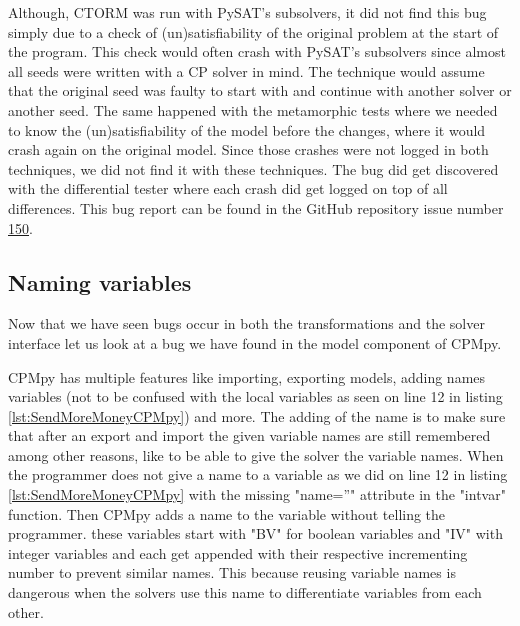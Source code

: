 Although, CTORM was run with PySAT's subsolvers, it did not find this bug simply due to a check of (un)satisfiability of the original problem at the start of the program. This check would often crash with PySAT's subsolvers since almost all seeds were written with a CP solver in mind. The technique would assume that the original seed was faulty to start with and continue with another solver or another seed. The same happened with the metamorphic tests where we needed to know the (un)satisfiability of the model before the changes, where it would crash again on the original model. Since those crashes were not logged in both techniques, we did not find it with these techniques. The bug did get discovered with the differential tester where each crash did get logged on top of all differences. This bug report can be found in the GitHub repository issue number \href{https://github.com/CPMpy/cpmpy/issues/150}{150}.

%
%

\subsection{Naming variables}
\label{res:bug:Naming+andImport}
Now that we have seen bugs occur in both the transformations and the solver interface let us look at a bug we have found in the model component of CPMpy. 

CPMpy has multiple features like importing, exporting models, adding names variables (not to be confused with the local variables as seen on line 12 in listing \ref{lst:SendMoreMoneyCPMpy}) and more. The adding of the name is to make sure that after an export and import the given variable names are still remembered among other reasons, like to be able to give the solver the variable names. When the programmer does not give a name to a variable as we did on line 12 in listing \ref{lst:SendMoreMoneyCPMpy} with the missing "name=''" attribute in the "intvar" function. Then CPMpy adds a name to the variable without telling the programmer. these variables start with "BV" for boolean variables and "IV" with integer variables and each get appended with their respective incrementing number to prevent similar names. This because reusing variable names is dangerous when the solvers use this name to differentiate variables from each other.


